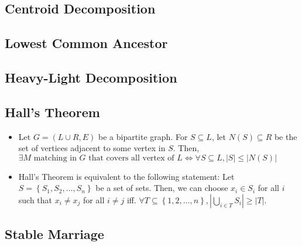 \documentclass[9pt,landscape,a4paper,twocolumn]{extarticle}
\begin{document}
% 

\subsection{Centroid Decomposition}


% 

\subsection{Lowest Common Ancestor}


\subsection{Heavy-Light Decomposition}


\subsection{Hall's Theorem}
\begin{itemize}
    \item
    Let $G=\left(L\cup R,E\right)$ be a bipartite graph.
    For $S\subseteq L$, let $N\left(S\right)\subseteq R$ be the set of vertices adjacent to some vertex in $S$.
    Then, $\exists M \text{ matching in } G \text{ that covers all vertex of } L \Leftrightarrow \forall S\subseteq L, |S|\leq |N(S)|$

    \item Hall's Theorem is equivalent to the following statement:
    Let $S=\left\{ S_1,S_2,\ldots,S_n \right\}$ be a set of sets.
    Then, we can choose $x_i\in S_i$ for all $i$ such that $x_i\neq x_j$ for all $i\neq j$
    iff. $\forall T\subseteq \left\{ 1,2,\ldots,n \right\}, \left| \bigcup_{i\in T} S_i \right|\geq |T|$.
\end{itemize}

\subsection{Stable Marriage}

\end{document}
